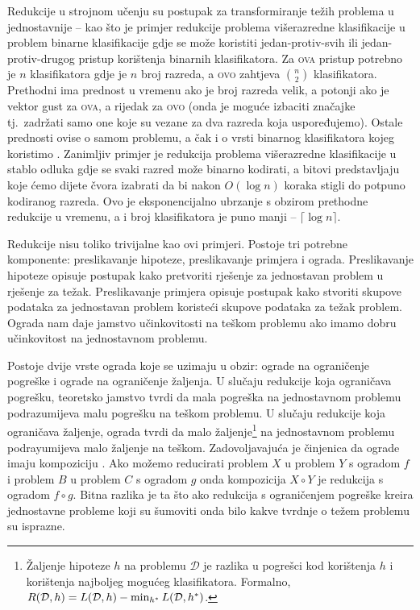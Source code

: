 Redukcije u strojnom učenju su postupak za transformiranje težih problema u
jednostavnije -- kao što je primjer redukcije problema višerazredne
klasifikacije u problem binarne klasifikacije gdje se može koristiti
jedan-protiv-svih  ili
jedan-protiv-drugog  pristup
korištenja binarnih klasifikatora. Za \textsc{ova} pristup potrebno je $n$
klasifikatora gdje je $n$ broj razreda, a \textsc{ovo} zahtjeva $\binom{n}{2}$
klasifikatora. Prethodni ima prednost u vremenu ako je broj razreda velik, a
potonji ako je vektor gust za \textsc{ova}, a rijedak za \textsc{ovo} (onda je
moguće izbaciti značajke tj.~zadržati samo one koje su vezane za dva razreda
koja uspoređujemo). Ostale prednosti ovise o samom problemu, a čak i o vrsti
binarnog klasifikatora kojeg koristimo \citep{milgram2006one}. Zanimljiv primjer
je redukcija problema višerazredne klasifikacije u stablo odluka  gdje se svaki razred može binarno kodirati, a bitovi predstavljaju koje
ćemo dijete čvora izabrati da bi nakon $O(\log n)$ koraka stigli do potpuno
kodiranog razreda. Ovo je eksponencijalno ubrzanje s obzirom prethodne redukcije
u vremenu, a i broj klasifikatora je puno manji -- $\lceil \log n \rceil$.

Redukcije nisu toliko trivijalne kao ovi primjeri. Postoje tri potrebne
komponente: preslikavanje hipoteze, preslikavanje primjera i ograda.
Preslikavanje hipoteze opisuje postupak kako pretvoriti rješenje za jednostavan
problem u rješenje za težak. Preslikavanje primjera opisuje postupak kako
stvoriti skupove podataka za jednostavan problem koristeći skupove podataka za
težak problem. Ograda nam daje jamstvo učinkovitosti na teškom problemu ako
imamo dobru učinkovitost na jednostavnom problemu.

Postoje dvije vrste ograda koje se uzimaju u obzir: ograde na ograničenje
pogreške i ograde na ograničenje žaljenja. U slučaju redukcije koja ograničava
pogrešku, teoretsko jamstvo tvrdi da mala pogreška na jednostavnom problemu
podrazumijeva malu pogrešku na teškom problemu. U slučaju redukcije koja
ograničava žaljenje, ograda tvrdi da malo žaljenje\footnote{Žaljenje hipoteze
$h$ na problemu $\mathcal{D}$ je razlika u pogrešci kod korištenja $h$ i
korištenja najboljeg mogućeg klasifikatora. Formalno, $R(\mathcal{D}, h) =
L(\mathcal{D}, h) - \min_{h\ssymbol{1}} L(\mathcal{D}, h\ssymbol{1})$.} na
jednostavnom problemu podrayumijeva malo žaljenje na teškom. Zadovoljavajuća je
činjenica da ograde imaju kompoziciju \cite{beygelzimer2005error}. Ako možemo
reducirati problem $X$ u problem $Y$ s ogradom $f$ i problem $B$ u problem $C$ s
ogradom $g$ onda kompozicija $X \circ Y$ je redukcija s ogradom $f \circ g$.
Bitna razlika je ta što ako redukcija s ograničenjem pogreške kreira jednostavne
probleme koji su šumoviti onda bilo kakve tvrdnje o težem problemu su isprazne.

